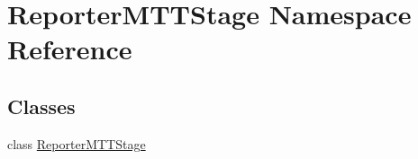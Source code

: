 \hypertarget{namespaceReporterMTTStage}{\section{Reporter\-M\-T\-T\-Stage Namespace Reference}
\label{namespaceReporterMTTStage}
}
\subsection*{Classes}
\begin{DoxyCompactItemize}
\item 
class \hyperlink{classReporterMTTStage_1_1ReporterMTTStage}{Reporter\-M\-T\-T\-Stage}
\end{DoxyCompactItemize}
